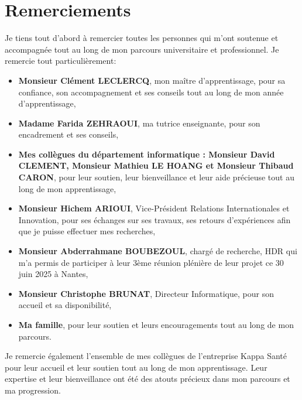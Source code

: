 \section{Remerciements}
Je tiens tout d'abord à remercier toutes les personnes qui m'ont soutenue et accompagnée tout au long de mon parcours universitaire et professionnel. 
Je remercie tout particulièrement: \
\begin{itemize}
    \item \textbf{Monsieur Clément LECLERCQ}, mon maître d'apprentissage, pour sa confiance, son accompagnement et ses conseils tout au long de mon année d'apprentissage,
    \item \textbf{Madame Farida ZEHRAOUI}, ma tutrice enseignante, pour son encadrement et ses conseils,
     \item \textbf{Mes collègues du département informatique : Monsieur David CLEMENT, Monsieur Mathieu LE HOANG et Monsieur Thibaud CARON}, pour leur soutien, leur bienveillance et leur aide précieuse tout au long de mon apprentissage,
    \item \textbf{Monsieur Hichem ARIOUI}, Vice-Président Relations Internationales et Innovation, pour ses échanges sur ses travaux, ses retours d'expériences afin que je puisse effectuer mes recherches,
    \item \textbf{Monsieur Abderrahmane BOUBEZOUL}, chargé de recherche, HDR qui m'a permis de participer à leur 3ème réunion plénière de leur projet ce 30 juin 2025 à Nantes,
    \item \textbf{Monsieur Christophe BRUNAT}, Directeur Informatique, pour son accueil et sa disponibilité,
    \item \textbf{Ma famille}, pour leur soutien et leurs encouragements tout au long de mon parcours.
\end{itemize}
\vspace{0.5cm}
Je remercie également l'ensemble de mes collègues de l'entreprise Kappa Santé pour leur accueil et leur soutien tout au long de mon apprentissage. Leur expertise et leur bienveillance ont été des atouts précieux dans mon parcours et ma progression.